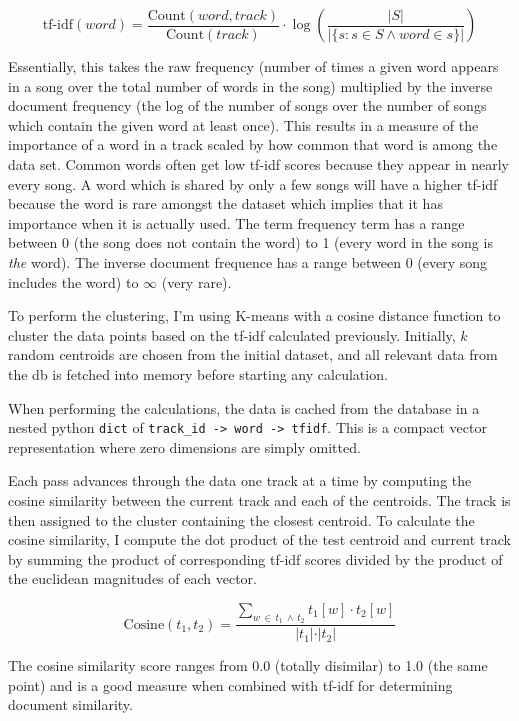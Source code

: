 \documentclass[11pt]{article}
\begin{document}
\[
    \text{tf-idf}(word) = \frac{\text{Count}(word,track)}{\text{Count}(track)} \cdot
                   \log{\left(\frac{\vert S \vert}{\vert\{s : s \in S \wedge word \in s\}\vert}\right)}
\]

Essentially, this takes the raw frequency (number of times a given word appears
in a song over the total number of words in the song) multiplied by the inverse
document frequency (the log of the number of songs over the number of songs
which contain the given word at least once). This results in a measure of the
importance of a word in a track scaled by how common that word is among the
data set. Common words often get low tf-idf scores because they appear in
nearly every song.  A word which is shared by only a few songs will have a
higher tf-idf because the word is rare amongst the dataset which implies that
it has importance when it is actually used. The term frequency term
has a range between 0 (the song does not contain the word) to 1 (every word in the
song is \emph{the} word). The inverse document frequence has a range between
0 (every song includes the word) to $\infty$ (very rare). 

To perform the clustering, I'm using K-means with a cosine distance
function to cluster the data points based on the tf-idf calculated previously.
Initially, $k$ random centroids are chosen from the initial dataset, and
all relevant data from the db is fetched into memory before starting any
calculation.

When performing the calculations, the data is cached from the database
in a nested python \verb|dict| of \verb|track_id -> word -> tfidf|. This is
a compact vector representation where zero dimensions are simply omitted. 

Each pass advances through the data one track at a time by computing the cosine similarity
between the current track and each of the centroids. The track is then 
assigned to the cluster containing the closest centroid.
To calculate the cosine similarity, I compute the dot product of the
test centroid and current track by summing the product of corresponding tf-idf
scores divided by the product of the euclidean magnitudes of each vector.

\[
    \text{Cosine}(t_1, t_2) = \frac{\sum\limits_{w \, \in \, t_1 \, \wedge \, t_2} t_1[w] \cdot t_2[w]}
                                   {\vert t_1 \vert \cdot \vert t_2 \vert}
\]

The cosine similarity score ranges from 0.0 (totally disimilar) to 1.0 (the same point)
and is a good measure when combined with tf-idf for determining document similarity.
\end{document}
